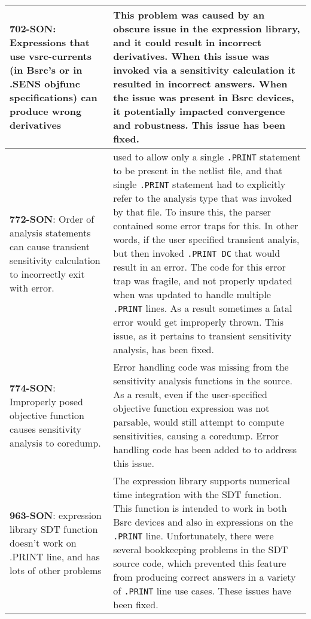 {\begin{longtable}[h] {>{\raggedright\small}m{2in}|>{\raggedright\let\\\tabularnewline\small}m{3.5in}}
     \textbf{702-SON}: Expressions that use vsrc-currents (in Bsrc's or in .SENS objfunc specifications) 
     can produce wrong derivatives & This problem was caused by an obscure issue in the expression library,
     and it could result in incorrect derivatives.  When this issue was invoked via a sensitivity calculation
     it resulted in incorrect answers.  When the issue was present in Bsrc devices, it potentially impacted
     convergence and robustness.  This issue has been fixed.
     \\ \hline

     \textbf{772-SON}: Order of analysis statements can cause transient sensitivity calculation to 
     incorrectly exit with error.  & \Xyce{} used to allow only a single \texttt{.PRINT} statement 
     to be present in the netlist file, and that single \texttt{.PRINT} statement had to explicitly refer
     to the analysis type that was invoked by that file.  To insure this, the parser contained some error 
     traps for this. In other words, if the user specified transient analyis, but then invoked 
     \texttt{.PRINT DC} that would result in an error.   The code for this error trap was fragile, 
     and not properly updated when \Xyce{} was updated to handle multiple \texttt{.PRINT} lines.  As a result
     sometimes a fatal error would get improperly thrown.  This issue, as it pertains to 
     transient sensitivity analysis, has been fixed.
     \\ \hline


     \textbf{774-SON}: Improperly posed objective function causes sensitivity analysis to coredump.  &  
     Error handling code was missing from the sensitivity analysis functions in the \Xyce{} source.  
     As a result, even if the user-specified objective function expression was not parsable, 
     \Xyce{} would still attempt to compute sensitivities,  causing a coredump.  Error 
     handling code has been added to \Xyce{} to address this issue.
     \\ \hline

     \textbf{963-SON}:  expression library SDT function doesn't work on .PRINT line, and has lots of other problems & 
     The expression library supports numerical time integration with the SDT function.  This function is intended to work
     in both Bsrc devices and also in expressions on the \texttt{.PRINT} line.  Unfortunately, 
     there were several bookkeeping problems in the SDT source code, which prevented this feature 
     from producing correct answers in a variety of \texttt{.PRINT} line use cases.  These issues have been fixed.
     \\ \hline


\end{longtable}}
